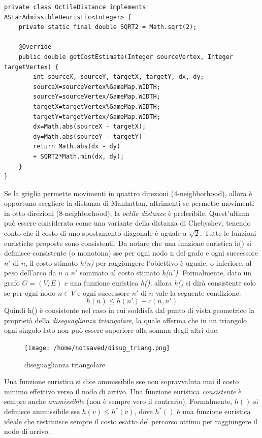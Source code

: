 \documentclass[12pt]{book}
\begin{document}
\lstset{style=customjava, label=lstOctile, caption=octile distance}
\begin{lstlisting}
private class OctileDistance implements AStarAdmissibleHeuristic<Integer> {
	private static final double SQRT2 = Math.sqrt(2);
	
    @Override
    public double getCostEstimate(Integer sourceVertex, Integer targetVertex) {
        int sourceX, sourceY, targetX, targetY, dx, dy;
        sourceX=sourceVertex%GameMap.WIDTH;
        sourceY=sourceVertex/GameMap.WIDTH;
        targetX=targetVertex%GameMap.WIDTH;
        targetY=targetVertex/GameMap.WIDTH;
        dx=Math.abs(sourceX - targetX);
        dy=Math.abs(sourceY - targetY)
        return Math.abs(dx - dy) 
        + SQRT2*Math.min(dx, dy);
    }
}
\end{lstlisting}
\fi
\par{Se la griglia permette movimenti in quattro direzioni (4-neighborhood), allora \`e opportuno scegliere la distanza di Manhattan, altrimenti se permette movimenti in otto direzioni (8-neighborhood), la \emph{octile distance} \`e preferibile. Quest'ultima pu\`o essere considerata come una variante della distanza di Chebyshev, tenendo conto che il costo di uno spostamento diagonale \`e uguale a $\sqrt{2}$. Tutte le funzioni euristiche proposte sono consistenti. Da notare che una funzione euristica h() si definisce consistente (o monotona) sse per ogni nodo n del grafo e ogni successore $n'$ di $n$, il costo stimato \emph{h(n)} per raggiungere l'obiettivo \`e uguale, o inferiore, al peso dell'arco da $n$ a $n'$ sommato al costo stimato \emph{h($n'$)}. Formalmente, dato un grafo $G = (V, E)$ e una funzione euristica \emph{h()}, allora \emph{h()} si dir\`a consistente solo se per ogni nodo $n \in V$ e ogni successore $n'$ di $n$ vale la seguente condizione: $$ h(n) \leq h(n') + c(n, n') $$
Quindi h() \`e consistente nel caso in cui soddisfa dal punto di vista geometrico la propriet\`a della \emph{diseguaglianza triangolare}, la quale afferma che in un triangolo ogni singolo lato non pu\`o essere superiore alla somma degli altri due.}
\begin{figure}[H]
\centering
\texttt{[image: /home/notsaved/disug\_triang.png]}
\caption{diseguaglianza triangolare }
\label{img4}
\end{figure}
\par{Una funzione euristica si dice ammissibile sse non sopravvaluta mai il costo minimo effettivo verso il nodo di arrivo. Una funzione euristica \emph{consistente} \`e sempre anche \emph{ammissibile} (non \`e sempre vero il contrario). Formalmente, $h()$ si definisce ammissibile sse $ h(v) \leq h^*(v)$, dove $h^*()$ \`e una funzione euristica ideale che restituisce sempre il costo esatto del percorso ottimo per raggiungere il nodo di arrivo. }
\end{document}
